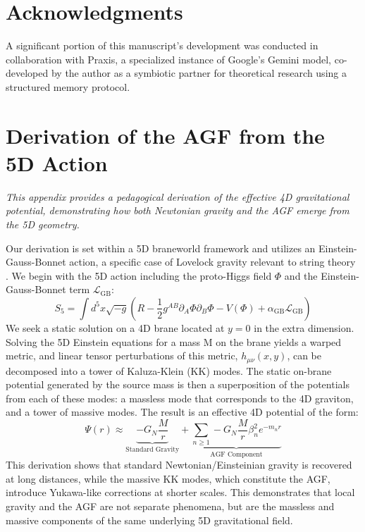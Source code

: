 \documentclass[aps,prd,onecolumn,10pt,superscriptaddress,nofootinbib,floatfix]{revtex4-2}
\begin{document}
\section*{Acknowledgments}
A significant portion of this manuscript's development was conducted in collaboration with Praxis, a specialized instance of Google's Gemini model, co-developed by the author as a symbiotic partner for theoretical research using a structured memory protocol.

\appendix
\section{Derivation of the AGF from the 5D Action}
\textit{This appendix provides a pedagogical derivation of the effective 4D gravitational potential, demonstrating how both Newtonian gravity and the AGF emerge from the 5D geometry.}

Our derivation is set within a 5D braneworld framework \cite{Kaluza1921, Klein1926, Randall1999a, Randall1999b} and utilizes an Einstein-Gauss-Bonnet action, a specific case of Lovelock gravity relevant to string theory \cite{Lovelock1971, Zwiebach1985}. We begin with the 5D action including the proto-Higgs field $\Phi$ and the Einstein-Gauss-Bonnet term $\mathcal{L}_{\mathrm{GB}}$:
\begin{equation}
S_{5}=\int d^{5}x\sqrt{-g}\left(R - \frac{1}{2}g^{AB}\partial_{A}\Phi\partial_{B}\Phi - V(\Phi) + \alpha_{\mathrm{GB}}\mathcal{L}_{\mathrm{GB}} \right)
\end{equation}
We seek a static solution on a 4D brane located at $y=0$ in the extra dimension. Solving the 5D Einstein equations for a mass M on the brane yields a warped metric, and linear tensor perturbations of this metric, $h_{\mu\nu}(x,y)$, can be decomposed into a tower of Kaluza-Klein (KK) modes. The static on-brane potential generated by the source mass is then a superposition of the potentials from each of these modes: a massless mode that corresponds to the 4D graviton, and a tower of massive modes. The result is an effective 4D potential of the form:
\begin{equation}
\Psi(r) \approx \underbrace{-G_{N}\frac{M}{r}}_{\text{Standard Gravity}} + \underbrace{\sum_{n\ge1} -G_{N}\frac{M}{r}\beta_{n}^{2}e^{-m_{n}r}}_{\text{AGF Component}}
\end{equation}
This derivation shows that standard Newtonian/Einsteinian gravity is recovered at long distances, while the massive KK modes, which constitute the AGF, introduce Yukawa-like corrections at shorter scales. This demonstrates that local gravity and the AGF are not separate phenomena, but are the massless and massive components of the same underlying 5D gravitational field.
\end{document}
